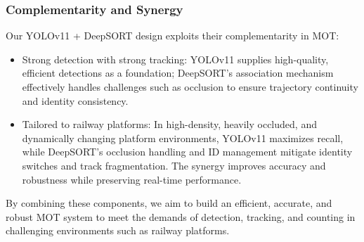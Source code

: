 \subsubsection{Complementarity and Synergy}

Our YOLOv11 + DeepSORT design exploits their complementarity in MOT:
\begin{itemize}
    \item Strong detection with strong tracking: YOLOv11 supplies high-quality, efficient detections as a foundation; DeepSORT’s association mechanism effectively handles challenges such as occlusion to ensure trajectory continuity and identity consistency.
    \item Tailored to railway platforms: In high-density, heavily occluded, and dynamically changing platform environments, YOLOv11 maximizes recall, while DeepSORT’s occlusion handling and ID management mitigate identity switches and track fragmentation. The synergy improves accuracy and robustness while preserving real-time performance.
\end{itemize}

By combining these components, we aim to build an efficient, accurate, and robust MOT system to meet the demands of detection, tracking, and counting in challenging environments such as railway platforms.

